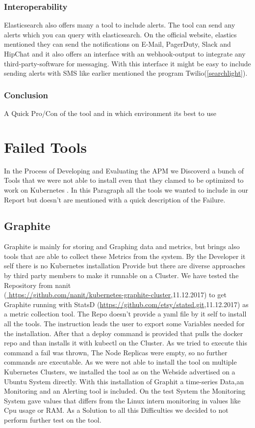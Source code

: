 \subsubsection{Interoperability}
Elasticsearch also offers many a tool to include alerts. The tool can send any alerts which you can query with elasticsearch. On the official website, elastics mentioned they can send the notifications on E-Mail, PagerDuty, Slack and HipChat and it also offers an interface with an webhook-output to integrate any third-party-software for messaging. With this interface it might be easy to include sending alerts with SMS like earlier mentioned the program Twilio(\ref{searchlight}).
\subsubsection{Conclusion}
A Quick Pro/Con of the tool and in which environment its best to use

\section{Failed Tools}%
In the Process of Developing and Evaluating the APM we Discoverd a bunch of Tools that we were not able to install even that they clamed to be optimized to work on Kubernetes .
In this Paragraph all the tools we wanted to include in our Report but doesn't are mentioned with a quick description of the Failure.
\subsection{Graphite}
Graphite is mainly for storing and Graphing data and metrics, but brings also tools that are able to collect these Metrics from the system. By the Developer it self there is no Kubernetes installation Provide but there are diverse approaches by third party members to make it runnable on a Cluster. We have tested the Repository from nanit\\(\url{ https://github.com/nanit/kubernetes-graphite-cluster},11.12.2017) to get Graphite running with StatsD (\url{https://github.com/etsy/statsd.git},11.12.2017) as a metric collection tool. The Repo doesn't provide a yaml file by it self to install all the tools. The instruction leads the user to export some Variables needed for the installation. After that a deploy command is provided that pulls the docker repo and than installs it with kubectl on the Cluster. As we tried to execute this command a fail was thrown, The Node Replicas were empty, so no further commands are executable. As we were not able to install the tool on multiple Kubernetes Clusters, we installed the tool as on the Webside advertised on a Ubuntu System directly. With this installation of Graphit a time-series Data,an Monitoring and an Alerting tool is included. On the test System the Monitoring System gave values that differs from the Linux intern monitoring in values like Cpu usage or RAM. As a Solution to all this Difficulties we decided to not perform further test on the tool.

